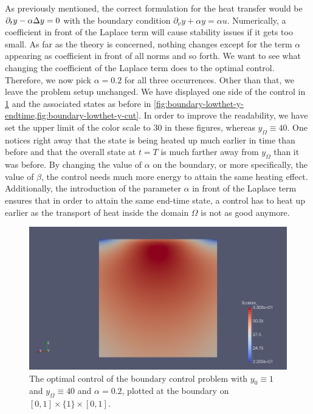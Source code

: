 \documentclass[../thesis.tex]{subfiles}
\begin{document}
As previously mentioned, the correct formulation for the heat transfer would be $\partial_t y - \alpha \Delta y = 0$ with the boundary condition $\partial_\nu y + \alpha y = \alpha u$.
Numerically, a coefficient in front of the Laplace term will cause stability issues if it gets too small.
As far as the theory is concerned, nothing changes except for the term $\alpha$ appearing as coefficient in front of all norms and so forth.
We want to see what changing the coefficient of the Laplace term does to the optimal control.
Therefore, we now pick $\alpha = 0.2$ for all three occurrences. Other than that, we leave the problem setup unchanged.
We have displayed one side of the control in \cref{fig:boundary-lowthet-u} and the associated states as before in \cref{fig:boundary-lowthet-y-endtime,fig:boundary-lowthet-y-cut}.
In order to improve the readability, we have set the upper limit of the color scale to $30$ in these figures, whereas $y_\Omega \equiv 40$.
One notices right away that the state is being heated up much earlier in time than before and that the overall state at $t = T$ is much farther away from $y_\Omega$ than it was before.
By changing the value of $\alpha$ on the boundary, or more specifically, the value of $\beta$, the control needs much more energy to attain the same heating effect.
Additionally, the introduction of the parameter $\alpha$ in front of the Laplace term ensures that in order to attain the same end-time state, a control has to heat up earlier as the transport of heat inside the domain $\Omega$ is not as good anymore.
\begin{figure}[htpb]
\centering
\includegraphics[width=\textwidth]{Images/boundary-lowthet-u.png}
\caption{The optimal control of the boundary control problem with $y_0 \equiv 1$ and $y_\Omega \equiv 40$ and $\alpha = 0.2$, plotted at the boundary on $[0, 1] \times \{ 1 \} \times [0, 1]$.}
\label{fig:boundary-lowthet-u}
\end{figure}
\end{document}

